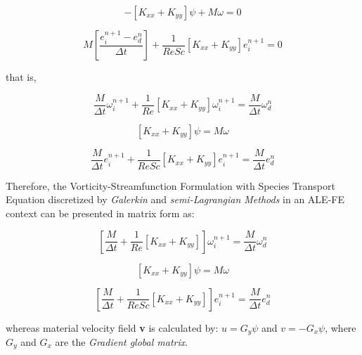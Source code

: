 \begin{equation}
 - \left[ K_{xx} + K_{yy} \right] \psi + M \omega = 0
\end{equation}

\begin{equation}
 M \left[ \frac{e^{n+1}_{i} - e^{n}_{d}}{\Delta t} \right]
 + \frac{1}{\textit{ReSc}} \left[ K_{xx} + K_{yy} \right] e^{n+1}_{i}
 = 0
\end{equation}


\medskip
\noindent
that is,

\begin{equation}
 \frac{M}{\Delta t} \omega^{n+1}_{i}
 + \frac{1}{\textit{Re}} \left[ K_{xx} + K_{yy} \right] \omega^{n+1}_{i}
 = \frac{M}{\Delta t} \omega^{n}_{d}
\end{equation}

\begin{equation}
 \left[ K_{xx} + K_{yy} \right] \psi 
 =  M \omega
\end{equation}

\begin{equation}
 \frac{M}{\Delta t} e^{n+1}_{i}
 + \frac{1}{\textit{ReSc}} \left[ K_{xx} + K_{yy} \right] e^{n+1}_{i}
 = \frac{M}{\Delta t} e^{n}_{d}
\end{equation}


\medskip
Therefore, the Vorticity-Streamfunction Formulation with
Species Transport Equation discretized by \textit{Galerkin}
and \textit{semi-Lagrangian Methods} in an ALE-FE context
can be presented in matrix form as:

\begin{equation}
 \left[
 \frac{M}{\Delta t} 
 + \frac{1}{\textit{Re}} \left[ K_{xx} + K_{yy} \right]
 \right] 
 \omega^{n+1}_{i}
 = \frac{M}{\Delta t} \omega^{n}_{d}
\end{equation}

\begin{equation}
 \left[ K_{xx} + K_{yy} \right] \psi 
 =  M \omega
\end{equation}

\begin{equation}
 \left[
 \frac{M}{\Delta t} 
 + \frac{1}{\textit{ReSc}} \left[ K_{xx} + K_{yy} \right]
 \right] 
 e^{n+1}_{i}
 = \frac{M}{\Delta t} e^{n}_{d}
\end{equation}

\medskip
\noindent
whereas material velocity field \textbf{v} is calculated by:
$u =   G_{y} \psi$ and 
$v = - G_{x} \psi$, 
where 
$G_{y}$ and 
$G_{x}$ are the \textit{Gradient global matrix}.
 

